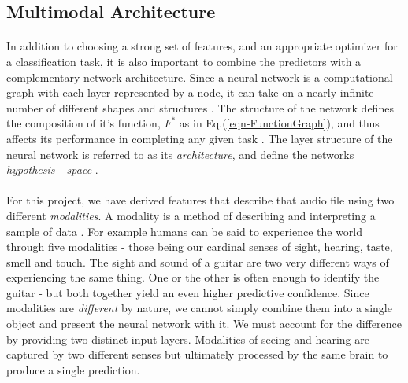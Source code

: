\documentclass[12pt,letterpaper]{article}
\begin{document}

\subsection{Multimodal Architecture}
\label{subsec-Architecture}

\paragraph*{}In addition to choosing a strong set of features, and an appropriate optimizer for a classification task, it is also important to combine the predictors with a complementary network architecture. Since a neural network is a computational graph with each layer represented by a node, it can take on a nearly infinite number of different shapes and structures \cite{Goodfellow,Virtanen}. The structure of the network defines the composition of it's function, $F^*$ as in Eq.(\ref{eqn-FunctionGraph}), and thus affects its performance in completing any given task \cite{Geron}. The layer structure of the neural network is referred to as its \textit{architecture}, and define the networks \textit{hypothesis - space} \cite{Goodfellow}. 

\paragraph*{}For this project, we have derived features that describe that audio file using two different \textit{modalities}. A modality is a method of describing and interpreting a sample of data \cite{Ngiam}. For example humans can be said to experience the world through five modalities - those being our cardinal senses of sight, hearing, taste, smell and touch. The sight and sound of a guitar are two very different ways of experiencing the same thing. One or the other is often enough to identify the guitar - but both together yield an even higher predictive confidence. Since modalities are \textit{different} by nature, we cannot simply combine them into a single object and present the neural network with it. We must account for the difference by providing two distinct input layers.  Modalities of seeing and hearing are captured by two different senses but ultimately processed by the same brain to produce a single prediction.
\end{document}
